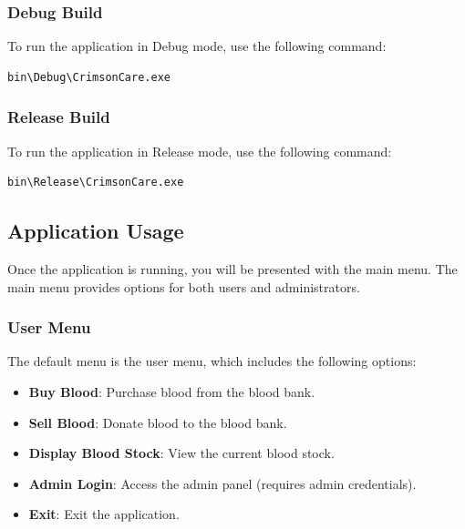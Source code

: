 \documentclass[12pt,a4paper]{report}
\begin{document}
\subsubsection{Debug Build}
To run the application in Debug mode, use the following command:
\begin{verbatim}
bin\Debug\CrimsonCare.exe
\end{verbatim}

\subsubsection{Release Build}
To run the application in Release mode, use the following command:
\begin{verbatim}
bin\Release\CrimsonCare.exe
\end{verbatim}

\subsection{Application Usage}
Once the application is running, you will be presented with the main menu. The main menu provides options for both users and administrators.

\subsubsection{User Menu}
The default menu is the user menu, which includes the following options:
\begin{itemize}
    \item \normalsize \textbf{Buy Blood}: Purchase blood from the blood bank.
    \item \normalsize \textbf{Sell Blood}: Donate blood to the blood bank.
    \item \normalsize \textbf{Display Blood Stock}: View the current blood stock.
    \item \normalsize \textbf{Admin Login}: Access the admin panel (requires admin credentials).
    \item \normalsize \textbf{Exit}: Exit the application.
\end{itemize}
\end{document}
